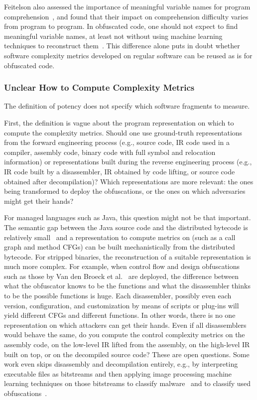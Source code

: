 Feitelson also assessed the importance of meaningful variable names for program comprehension~\cite{feitelson}, and found that their impact on comprehension difficulty varies from program to program. In obfuscated code, one should not expect to find meaningful variable names, at least not without using machine learning techniques to reconstruct them~\cite{2017_recovering_clear_natural_identifiers_from_obfuscated_js_names,banerjee2021variablerecoverydecompiledbinary}. This difference alone puts in doubt whether software complexity metrics developed on regular software can be reused as is for obfuscated code.  


\subsubsection{Unclear How to Compute Complexity Metrics}
\label{sec:unclear_computations}
The definition of potency does not specify which software fragments to measure.  

First, the definition is vague about the program representation on which to compute the complexity metrics. Should one use ground-truth representations from the forward engineering process (e.g., source code, IR code used in a compiler, assembly code, binary code with full symbol and relocation information) or representations built during the reverse engineering process (e.g., IR code built by a disassembler, IR obtained by code lifting, or source code obtained after decompilation)? Which representations are more relevant: the ones being transformed to deploy the obfuscations, or the ones on which adversaries might get their hands?

For managed languages such as Java, this question might not be that important. The semantic gap between the Java source code and the distributed bytecode is relatively small~\cite{batchelder2007obfuscating} and a representation to compute metrics on (such as a call graph and method CFGs) can be built mechanistically from the distributed bytecode. 
For stripped binaries, the reconstruction of a suitable representation is much more complex. For example, when control flow and design obfuscations such as those by Van den Broeck et al.~\cite{jens21} are deployed, the difference between what the obfuscator knows to be the functions and what the disassembler thinks to be the possible functions is huge. Each disassembler, possibly even each version, configuration, and customization by means of scripts or plug-ins will yield different CFGs and different functions. In other words, there is no one representation on which attackers can get their hands. Even if all disassemblers would behave the same, do you compute the control complexity metrics on the assembly code, on the low-level IR lifted from the assembly, on the high-level IR built on top, or on the decompiled source code? These are open questions. Some work even skips disassembly and decompilation entirely, e.g., by interpreting executable files as bitstreams and then applying image processing machine learning techniques on those bitstreams to classify malware~\cite{ni2018malware,marastoni2021data} and to classify used obfuscations~\cite{secrypt21}.

